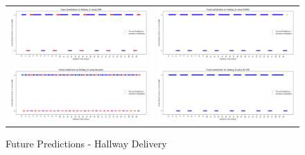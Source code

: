 \begin{figure}
  \begin{tabular}{cc}
    {\includegraphics[width = 3in]{images/results/Future_hallway_D_DMM.png}} &
    {\includegraphics[width = 3in]{images/results/Future_hallway_D_FreMEn.png}} \\
    {\includegraphics[width = 3in]{images/results/Future_hallway_D_Gaussian.png}} &
    {\includegraphics[width = 3in]{images/results/Future_hallway_D_HyT-EM.png}} \\
  \end{tabular}
  \caption{Future Predictions - Hallway Delivery}
\end{figure}\\ \\

